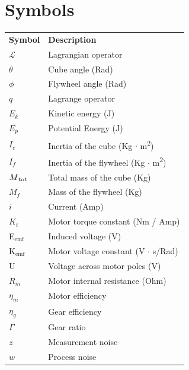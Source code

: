 \documentclass[a4paper,11pt]{kth-mag}
\newcommand{\textunderscript}[1]{$_{\text{#1}}$}
\begin{document}
\section*{Symbols}
\noindent{}\begin{tabular}{@{}p{2.5cm}l}
\textbf{Symbol} 	& \textbf{Description} \vspace{.5em} \\
$\mathcal{L}$			& Lagrangian operator \\
$\theta$		& Cube angle (Rad)\\
$\phi$		& Flywheel angle (Rad) \\
$q$			& Lagrange operator \\
$E_k	$		& Kinetic energy (J)\\
$E_p$		& Potential Energy (J)\\
$I_c$		& Inertia of the cube (Kg $\cdot$ m\textsuperscript{2})\\
$I_f$		& Inertia of the flywheel (Kg $\cdot$ m\textsuperscript{2})\\
$M\textsubscript{tot}$		& Total mass of the cube (Kg)\\
$M_f$		& Mass of the flywheel (Kg)\\
$i$			& Current (Amp)\\
$K_t$		& Motor torque constant (Nm / Amp)\\
E\textunderscript{emf} 	& Induced voltage (V)\\
K\textunderscript{emf} 	& Motor voltage constant (V $\cdot$ s/Rad)\\
U			& Voltage across motor poles (V)\\
$R_m	$		& Motor internal resistance (Ohm)\\
$\eta_m$		& Motor efficiency\\	
$\eta_g$		& Gear efficiency \\
$\Gamma$		& Gear ratio\\
$z$			& Measurement noise \\
$w$			& Process noise \\

\end{tabular}
\clearpage
\end{document}
